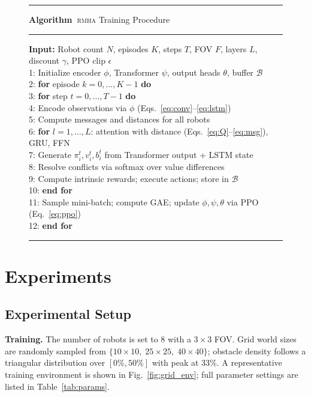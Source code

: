 \documentclass[conference]{IEEEtran}
\newcounter{algctr}
\renewcommand{\thealgctr}{\arabic{algctr}}
\newcommand{\rmha}{\textsc{rmha}}
\begin{document}
\begin{figure}[t]
\hrule\smallskip
\noindent\textbf{Algorithm~\thealgctr}\quad \rmha{} Training Procedure
\label{alg:rmha}\smallskip\hrule\smallskip
{\small
\noindent\textbf{Input:} Robot count $N$, episodes $K$, steps $T$,
FOV $F$, layers $L$, discount $\gamma$, PPO clip $\epsilon$\\[2pt]
1: Initialize encoder $\phi$, Transformer $\psi$, output heads $\theta$, buffer $\mathcal{B}$\\
2: \textbf{for} episode $k = 0, \ldots, K\!-\!1$ \textbf{do}\\
3: \quad\textbf{for} step $t = 0, \ldots, T\!-\!1$ \textbf{do}\\
4: \quad\quad Encode observations via $\phi$ (Eqs.~\ref{eq:conv}--\ref{eq:lstm})\\
5: \quad\quad Compute messages and distances for all robots\\
6: \quad\quad \textbf{for} $l = 1, \ldots, L$: attention with distance (Eqs.~\ref{eq:Q}--\ref{eq:msg}), GRU, FFN\\
7: \quad\quad Generate $\pi_i^t, v_i^t, b_i^t$ from Transformer output + LSTM state\\
8: \quad\quad Resolve conflicts via softmax over value differences\\
9: \quad\quad Compute intrinsic rewards; execute actions; store in $\mathcal{B}$\\
10: \quad\textbf{end for}\\
11: \quad Sample mini-batch; compute GAE; update $\phi,\psi,\theta$ via PPO (Eq.~\ref{eq:ppo})\\
12: \textbf{end for}
}\smallskip\hrule
\end{figure}

\section{Experiments}

\subsection{Experimental Setup}

\textbf{Training.}
The number of robots is set to 8 with a $3\times 3$ FOV.
Grid world sizes are randomly sampled from
$\{10\!\times\!10,\; 25\!\times\!25,\; 40\!\times\!40\}$;
obstacle density follows a triangular distribution over
$[0\%,50\%]$ with peak at 33\%.
A representative training environment is shown in
Fig.~\ref{fig:grid_env}; full parameter settings are listed in
Table~\ref{tab:params}.
\end{document}
